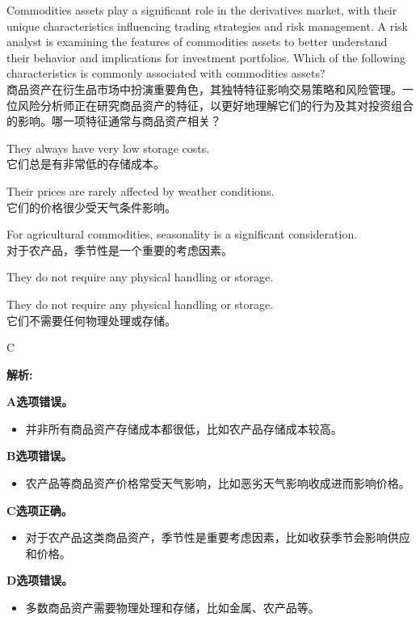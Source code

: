 \documentclass{article}
\newcounter{question} %
\newenvironment{explanation}
{\textbf{解析:}\par}
{\par}
\begin{document}
\begin{question}
    Commodities assets play a significant role in the derivatives market, with their unique characteristics influencing trading strategies and risk management. A risk analyst is examining the features of commodities assets to better understand their behavior and implications for investment portfolios. Which of the following characteristics is commonly associated with commodities assets?\\
    商品资产在衍生品市场中扮演重要角色，其独特特征影响交易策略和风险管理。一位风险分析师正在研究商品资产的特征，以更好地理解它们的行为及其对投资组合的影响。哪一项特征通常与商品资产相关？
    \end{question}
    
    \begin{choices}
        \item They always have very low storage costs.\\
        它们总是有非常低的存储成本。
        \item Their prices are rarely affected by weather conditions.\\
        它们的价格很少受天气条件影响。
        \item For agricultural commodities, seasonality is a significant consideration.\\
        对于农产品，季节性是一个重要的考虑因素。
        \item They do not require any physical handling or storage.
        \item They do not require any physical handling or storage.\\
        它们不需要任何物理处理或存储。
    \end{choices}
    
    \begin{correctanswer}
    C
    \end{correctanswer}
    
    \begin{explanation}
    \textbf{A选项错误。}
    \begin{itemize}
    \item 并非所有商品资产存储成本都很低，比如农产品存储成本较高。
    \end{itemize}
    \textbf{B选项错误。}
    \begin{itemize}
    \item 农产品等商品资产价格常受天气影响，比如恶劣天气影响收成进而影响价格。
    \end{itemize}
    \textbf{C选项正确。}
    \begin{itemize}
    \item 对于农产品这类商品资产，季节性是重要考虑因素，比如收获季节会影响供应和价格。
    \end{itemize}
    \textbf{D选项错误。}
    \begin{itemize}
    \item 多数商品资产需要物理处理和存储，比如金属、农产品等。
    \end{itemize}
    \end{explanation}
    
\end{document}
